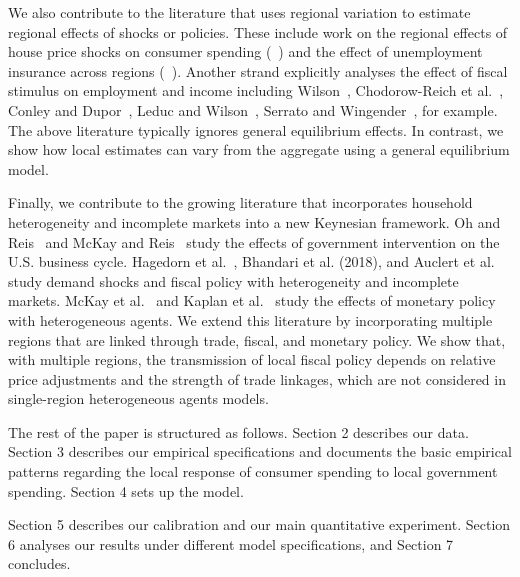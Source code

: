 \documentclass[\latexroot/\projectname]{subfiles}
\begin{document}
We also contribute to the literature that uses regional variation to estimate regional effects of shocks or policies. These include work on the regional effects of house price shocks on consumer spending (~\cite{Mian2013-wr}) and the effect of unemployment insurance across regions (~\cite{HagedornUnknown-qq}). Another strand explicitly analyses the effect of fiscal stimulus on employment and income including Wilson~\cite{Wilson2012-bc}, Chodorow-Reich et al.~\cite{Chodorow-Reich2012-bo}, Conley and Dupor~\cite{Conley2013-ca}, Leduc and Wilson~\cite{Leduc2017-yn}, Serrato and Wingender~\cite{Serrato2016-wo}, for example. The above literature typically ignores general equilibrium effects. In contrast, we show how local estimates can vary from the aggregate using a general equilibrium model.

Finally, we contribute to the growing literature that incorporates household heterogeneity and incomplete markets into a new Keynesian framework. Oh and Reis~\cite{Oh2012-ax} and McKay and Reis~\cite{McKay2016-pm} study the effects of government intervention on the U.S. business cycle. Hagedorn et al.~\cite{Hagedorn2019-op}, Bhandari et al. (2018), and Auclert et al.~\cite{Auclert2018-ii} study demand shocks and fiscal policy with heterogeneity and incomplete markets. McKay et al.~\cite{McKay2016-si} and Kaplan et al.~\cite{Kaplan2018-sr} study the effects of monetary policy with heterogeneous agents. We extend this literature by incorporating multiple regions that are linked through trade, fiscal, and monetary policy. We show that, with multiple regions, the transmission of local fiscal policy depends on relative price adjustments and the strength of trade linkages, which are not considered in single-region heterogeneous agents models.

The rest of the paper is structured as follows. Section 2 describes our data. Section 3 describes our empirical specifications and documents the basic empirical patterns regarding the local response of consumer spending to local government spending. Section 4 sets up the model.

Section 5 describes our calibration and our main quantitative experiment. Section 6 analyses our results under different model specifications, and Section 7 concludes.

\smartbib
\end{document}
